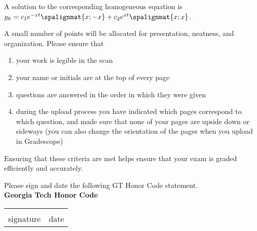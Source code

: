 \documentclass[12pt]{exam}
\begin{document}
\begin{questions}
    A solution to the corresponding homogeneous equation is $y_h = c_1e^{-xt}\spalignmat{x;-x}+c_2e^{xt}\spalignmat{x;x}$.


    \newpage
    \question[2] A small number of points will be allocated for presentation, neatness, and organization. Please ensure that
    \begin{enumerate}
        \item your work is legible in the scan
        \item your name or initials are at the top of every page
        \item questions are answered in the order in which they were given
        \item during the upload process you have indicated which pages correspond to which question, and made sure that none of your pages are upside down or sideways (you can also change the orientation of the pages when you upload in Gradescope)
    \end{enumerate}
    Ensuring that these criteria are met helps ensure that your exam is graded efficiently and accurately. 
    


    
\end{questions}
    
    Please sign and date the following GT Honor Code statement. \\ 
    
    \vspace{6pt}
    \textbf{Georgia Tech Honor Code}\\
    \GTHonorCode
    
    \begin{center}
    \begin{center}
        \def\arraystretch{0.35}%
        \begin{tabular}{ b{8cm} b{8cm} }
        \vspace{.5cm} \underline{\hspace{7cm}} & \vspace{.5cm} \underline{\hspace{4.5cm}}  \tabularnewline
        \vspace{6pt} signature & \vspace{6pt} date    
        \end{tabular}
    \end{center}
    \end{center}    
\end{document}
